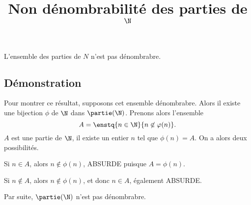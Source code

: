 \documentclass[fontsize=12pt,twoside=false,parskip=half, french]{scrartcl}
\title{Non dénombrabilité des parties de $\N$}
\date{}
\author{}
\begin{document}
\maketitle
   \begin{Theoreme}
      L’ensemble des parties de $N$ n’est pas dénombrabre.
   \end{Theoreme}
   \subsection{Démonstration}
      Pour montrer ce résultat, supposons cet ensemble dénombrabre. Alors il existe une bijection
      $\phi$ de $\N$ dans $\partie(\N)$. Prenons alors l’ensemble
      \[
         A = \enstq{n \in \N}{n \not \in \varphi(n)}.
      \]      
      $A$ est une partie de $\N$, il existe un entier $n$ tel que $\phi(n) = A$. On a alors deux possibilités.
      \begin{description}
         \item Si $n \in A$, alors $n \not \in \phi(n)$, ABSURDE puisque $A = \phi(n)$.
         \item Si $n \not \in A$, alors $n \not \in \phi(n)$, et donc $n \in A$, également ABSURDE.
      \end{description}
      Par suite, $\partie(\N)$ n’est pas dénombrabre.
\end{document}
